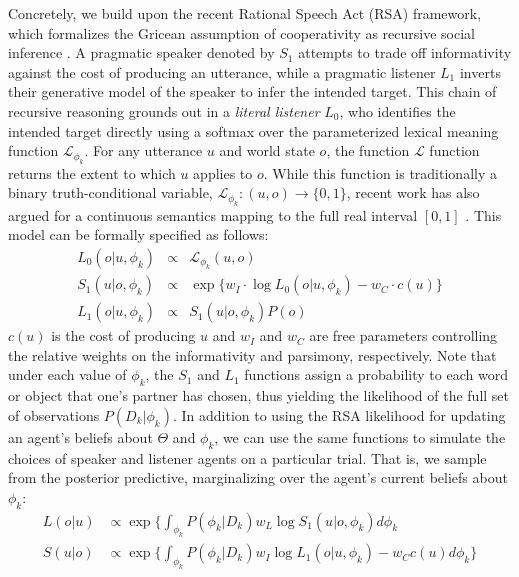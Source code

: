 Concretely, we build upon the recent Rational Speech Act (RSA) framework, which formalizes the Gricean assumption of cooperativity as recursive social inference \cite{GoodmanFrank16_RSATiCS}.
A pragmatic speaker denoted by $S_1$ attempts to trade off informativity against the cost of producing an utterance, while a pragmatic listener $L_1$ inverts their generative model of the speaker to infer the intended target.
This chain of recursive reasoning grounds out in a \emph{literal listener} $L_0$, who identifies the intended target directly using a softmax over the parameterized lexical meaning function $\mathcal{L}_{\phi_k}$. 
For any utterance $u$ and world state $o$, the function $\mathcal{L}$ function returns the extent to which $u$ applies to $o$.
While this function is traditionally a binary truth-conditional variable, $\mathcal{L}_{\phi_k}: (u,o) \rightarrow \{0,1\}$, recent work has also argued for a continuous semantics mapping to the full real interval $[0,1]$  \cite{degen2020redundancy}.
This model can be formally specified as follows:
$$
\begin{array}{rcl}
L_0(o | u, \phi_k) &\propto  & \mathcal{L}_{\phi_k}(u,o) \\
S_1(u | o, \phi_k) &\propto &  \exp\{w_I \cdot \log L_0(o | u, \phi_k) - w_C \cdot c(u)\}   \\
L_1(o | u, \phi_k) &\propto  & S_1(u | o, \phi_k) P(o) 
\end{array}
$$
$c(u)$ is the cost of producing $u$ and $w_I$ and $w_C$ are free parameters controlling the relative weights on the informativity and parsimony, respectively.
Note that under each value of $\phi_k$, the $S_1$ and $L_1$ functions assign a probability to each word or object that one's partner has chosen, thus yielding the likelihood of the full set of observations $P(D_k | \phi_k)$.
In addition to using the RSA likelihood for updating an agent's beliefs about $\Theta$ and $\phi_k$, we can use the same functions to simulate the choices of speaker and listener agents on a particular trial.
That is, we sample from the posterior predictive, marginalizing over the agent's current beliefs about $\phi_k$:
\begin{align}
L(o|u) &\propto   \exp\{ \textstyle{\int_{\phi_k}} P(\phi_k | D_k) w_L \log S_1(u|o, \phi_k)d\phi_k\label{eq:marginalized}\\
S(u|o) &\propto  \exp\{ \textstyle{\int_{\phi_k}} P(\phi_k | D_k)  w_I \log L_1(o| u, \phi_k) - w_C c(u)d\phi_k\}\nonumber
\end{align}

